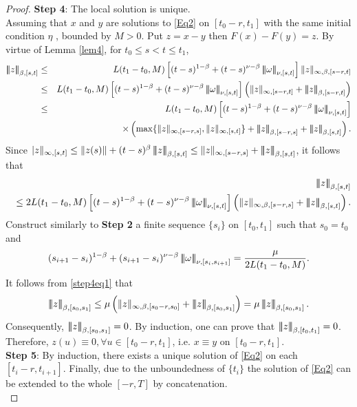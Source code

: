 \documentclass[graybox]{svmult}
\newcommand{\ltn}{\ensuremath{\left| \! \left| \! \left|}}
\newcommand{\rtn}{\ensuremath{\right| \! \right| \! \right|}}
\begin{document}
\begin{proof}
	{\bf {Step 4}}: The local solution is unique.\\
	Assuming that $x $ and $y$ are solutions to \eqref{Eq2} on $[t_0-r,t_1]$ with the same initial condition $\eta$ , bounded by $M>0$. Put $z=x-y$ then $F(x)-F(y) = z$. By virtue of Lemma \ref{lem4}, for $t_0\leq s<t\leq t_1$,
	\begin{eqnarray*}
		\ltn z\rtn_{\beta,[s,t]} &\leq &L(t_1-t_0,M) \left[(t-s)^{1-\beta} +(t-s)^{\nu-\beta} \ltn \omega\rtn_{\nu,[s,t]}\right] \| z\|_{\infty,\beta,[s-r,t]}\notag\\
		&\leq &L(t_1-t_0,M) \left[(t-s)^{1-\beta} +(t-s)^{\nu-\beta} \ltn \omega\rtn_{\nu,[s,t]}\right] \left(\| z\|_{\infty,[s-r,t]}+\ltn z\rtn_{\beta,[s-r,t]}\right)\notag\\
		&\leq &L(t_1-t_0,M) \left[(t-s)^{1-\beta} +(t-s)^{\nu-\beta} \ltn \omega\rtn_{\nu,[s,t]}\right] \\
		&&\times\left(\max\{\| z\|_{\infty,[s-r,s]},\| z\|_{\infty,[s,t]} \}+\ltn z\rtn_{\beta,[s-r,s]}+\ltn z\rtn_{\beta,[s,t]}\right).\notag
	\end{eqnarray*}
	Since $| z\|_{\infty,[s,t]}\leq \|z(s)\| + (t-s)^\beta \ltn z\rtn_{\beta,[s,t]}\leq \| z\|_{\infty,[s-r,s]} + \ltn z\rtn_{\beta,[s,t]}$, it follows that
	\begin{eqnarray}\label{step4eq1}
	&&\ltn z\rtn_{\beta,[s,t]} \notag\\
	&&\leq 2L(t_1-t_0,M) \left[(t-s)^{1-\beta} +(t-s)^{\nu-\beta} \ltn \omega\rtn_{\nu,[s,t]}\right]\left( \| z\|_{\infty,\beta,[s-r,s]} + \ltn z\rtn_{\beta,[s,t]}\right). \notag\\
	\end{eqnarray}
	Construct similarly to {\bf {Step 2}} a finite sequence $\{s_i\}$ on $[t_0,t_1]$ such that $s_0=t_0$ and
	\[
	(s_{i+1} - s_i)^{1-\beta} + (s_{i+1} - s_i)^{\nu-\beta}   \ltn \omega\rtn_{\nu,[s_i,s_{i+1}]} = \frac{\mu}{2L(t_1-t_0,M)}.
	\]
	It follows from \eqref{step4eq1} that 
	\begin{eqnarray}
	\ltn z\rtn_{\beta,[s_0,s_1]} \leq \mu \left( \| z\|_{\infty,\beta,[s_0-r,s_0]} + \ltn z\rtn_{\beta,[s_0,s_1]}\right)=\mu \ltn z\rtn_{\beta,[s_0,s_1]}.
	\end{eqnarray}
	Consequently,  $\ltn z\rtn_{\beta,[s_0,s_1]}=0$. By induction, one can prove that $\ltn z\rtn_{\beta,[t_0,t_1]}=0$. Therefore, $z(u)\equiv 0,\forall u\in [t_0-r,t_1]$, i.e. $x\equiv y$ on $[t_0-r,t_1]$.\\
	
	
	{\bf {Step 5}}: By induction, there exists a unique solution of \eqref{Eq2} on each $[t_i-r,t_{i+1}]$. Finally, due to the unboundedness of $\{t_i\}$ the solution of \eqref{Eq2} can be extended to the whole $[-r,T]$ by concatenation. \\
\end{proof}
\end{document}

